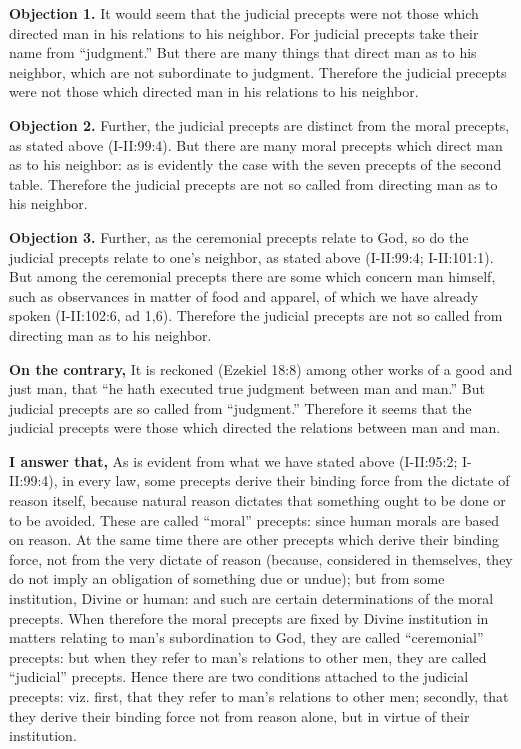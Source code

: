 
\textbf{Objection 1.} It would seem that the judicial precepts were not those which directed man in his relations to his neighbor. For judicial precepts take their name from ``judgment.'' But there are many things that direct man as to his neighbor, which are not subordinate to judgment. Therefore the judicial precepts were not those which directed man in his relations to his neighbor.

\textbf{Objection 2.} Further, the judicial precepts are distinct from the moral precepts, as stated above (I-II:99:4). But there are many moral precepts which direct man as to his neighbor: as is evidently the case with the seven precepts of the second table. Therefore the judicial precepts are not so called from directing man as to his neighbor.

\textbf{Objection 3.} Further, as the ceremonial precepts relate to God, so do the judicial precepts relate to one's neighbor, as stated above (I-II:99:4; I-II:101:1). But among the ceremonial precepts there are some which concern man himself, such as observances in matter of food and apparel, of which we have already spoken (I-II:102:6, ad 1,6). Therefore the judicial precepts are not so called from directing man as to his neighbor.

\textbf{On the contrary,} It is reckoned (Ezekiel 18:8) among other works of a good and just man, that ``he hath executed true judgment between man and man.'' But judicial precepts are so called from ``judgment.'' Therefore it seems that the judicial precepts were those which directed the relations between man and man.

\textbf{I answer that,} As is evident from what we have stated above (I-II:95:2; I-II:99:4), in every law, some precepts derive their binding force from the dictate of reason itself, because natural reason dictates that something ought to be done or to be avoided. These are called ``moral'' precepts: since human morals are based on reason. At the same time there are other precepts which derive their binding force, not from the very dictate of reason (because, considered in themselves, they do not imply an obligation of something due or undue); but from some institution, Divine or human: and such are certain determinations of the moral precepts. When therefore the moral precepts are fixed by Divine institution in matters relating to man's subordination to God, they are called ``ceremonial'' precepts: but when they refer to man's relations to other men, they are called ``judicial'' precepts. Hence there are two conditions attached to the judicial precepts: viz. first, that they refer to man's relations to other men; secondly, that they derive their binding force not from reason alone, but in virtue of their institution.

